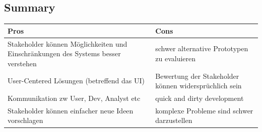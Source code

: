 \subsection{Summary}
\begin{table}[!h]
	\centering
	\begin{tabular}{|p{20em}|p{20em}|}
		\hline
		\textbf{Pros}	& \textbf{Cons}\\
		\hline
		Stakeholder können Möglichkeiten und Einschränkungen des Systems besser verstehen & schwer alternative Prototypen zu evaluieren\\
		\hline
		User-Centered Lösungen (betreffend das UI) & Bewertung der Stakeholder können widersprüchlich sein\\
		\hline
		Kommunikation zw User, Dev, Analyst etc & quick and dirty development\\
		\hline
		Stakeholder können einfacher neue Ideen vorschlagen & komplexe Probleme sind schwer darzustellen\\
		\hline
	\end{tabular}
\end{table}
